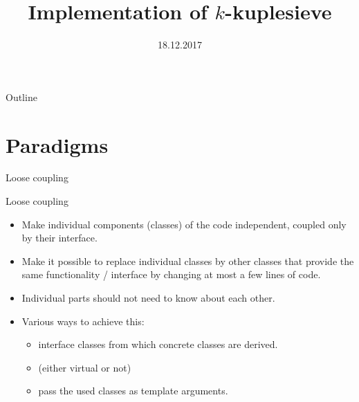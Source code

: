 \documentclass{beamer}
\title[Sieving code]{Implementation of $k$-kuplesieve}
\date{18.12.2017}
\institute{ENS Lyon}
\begin{document}
\frame{\maketitle}

\begin{frame}{Outline}
\tableofcontents
\end{frame}
\section{Paradigms}

\begin{frame}{Loose coupling}
\begin{block}{Loose coupling}
\begin{itemize}
\item Make individual components (classes) of the code independent, coupled only by their interface.
\item Make it possible to replace individual classes by other classes that provide the same functionality / interface by changing at most a few lines of code.
\item Individual parts should not need to know about each other.
\item Various ways to achieve this:
\begin{itemize}
\item interface classes from which concrete classes are derived.
\item (either virtual or not)
\item \alert{pass the used classes as template arguments.}
\end{itemize}
\end{itemize}
\end{block}
\end{frame}
\end{document}
